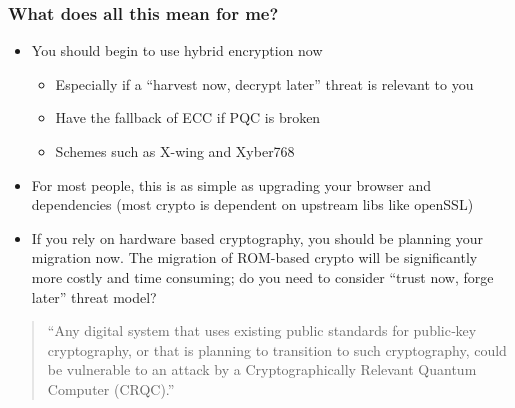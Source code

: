 \documentclass[
aspectratio=169, %
t, %
onlytextwidth, %
10pt, %
]{beamer}
\begin{document}
\begin{frame}
    \frametitle{What does all this mean for me?}
    \begin{adjustwidth}{0cm}{0.15\textwidth} %
        \begin{itemize}
            \item You should begin to use hybrid encryption now
            \begin{itemize}
                \item Especially if a ``harvest now, decrypt later'' threat is relevant to you
                \item Have the fallback of ECC if PQC is broken
                \item Schemes such as X-wing and Xyber768
            \end{itemize}
            \item For most people, this is as simple as upgrading your browser and dependencies (most crypto is dependent on upstream libs like openSSL)
            \item If you rely on hardware based cryptography, you should be planning your migration now. The migration of ROM-based crypto will be significantly more costly and time consuming; do you need to consider ``trust now, forge later'' threat model?
        \end{itemize}
        \vspace{0.5em}
        \begin{quote}
            ``Any digital system that uses existing public standards for public‑key cryptography, or that is planning to transition to such cryptography, could be vulnerable to an attack by a Cryptographically Relevant Quantum Computer (CRQC).''\\
        \end{quote}
    \end{adjustwidth}
\end{frame}

\end{document}
